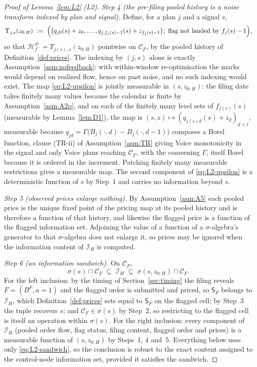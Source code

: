 \documentclass[11pt]{article}
\newcommand{\Sfl}{\mathsf{S}_F}
\begin{document}
\begin{proof}[Proof of Lemma~\ref{lem:L2} (L2)]
\emph{Step 4 (the pre-filing pooled history is a noise transform indexed by plan and signal).}
Define, for a plan $j$ and a signal $s$,
\begin{equation}
\label{eq:L2-upsilon}
\Upsilon_{j,s}(z_{0:H}) \;:=\;
  \Bigl( \bigl(q_{j0}(s)+z_0,\dots,q_{j,f_j(s)-1}(s)+z_{f_j(s)-1}\bigr);\ \text{flag not landed by }
  f_j(s)-1 \Bigr),
\end{equation}
so that $\mathcal H_{f^-}^P = \Upsilon_{j(s),s}(z_{0:H})$ pointwise on $\mathcal C_F$, by the pooled
history of Definition~\ref{def:prices}. The indexing by $(j,s)$ alone is exactly
Assumption~\ref{asm:nofeedback}: with within-window re-optimisation the marks would depend on
realised flow, hence on past noise, and no such indexing would exist. The map
\eqref{eq:L2-upsilon} is jointly measurable in $(s,z_{0:H})$: the filing date takes finitely many
values because the calendar is finite by Assumption~\ref{asm:A2p}, and on each of the finitely many
level sets of $f_{j(s)}(s)$ (measurable by Lemma~\ref{lem:D1}), the map is
$(s,z) \mapsto (q_{j(s)d}(s)+z_d)_{d<t}$, measurable because
$q_{jd} = \Gamma\bigl(B_j(\cdot,d)-B_j(\cdot,d-1)\bigr)$ composes a Borel function, clause (TR-ii) of
Assumption~\ref{asm:TR} giving Voice monotonicity in the signal and only Voice plans reaching
$\mathcal C_F$, with the coarsening $\Gamma$, itself Borel because it is ordered in the increment.
Patching finitely many measurable restrictions gives a measurable map. The second component of
\eqref{eq:L2-upsilon} is a deterministic function of $s$ by Step~1 and carries no information beyond
$s$.

\emph{Step 5 (observed prices enlarge nothing).} By Assumption~\ref{asm:A5} each pooled price is the
unique fixed point of the pricing map at its pooled history and is therefore a function of that
history, and likewise the flagged price is a function of the flagged information set. Adjoining the
value of a function of a $\sigma$-algebra's generator to that $\sigma$-algebra does not enlarge it,
so prices may be ignored when the information content of $\mathcal I_H$ is computed.

\emph{Step 6 (an information sandwich).} On $\mathcal C_F$,
\begin{equation}
\label{eq:L2-sandwich}
\sigma(s) \cap \mathcal C_F \;\subseteq\; \mathcal I_H \;\subseteq\;
  \sigma(s,z_{0:H}) \cap \mathcal C_F .
\end{equation}
For the left inclusion: by the timing of Section~\ref{sec:timing} the filing reveals
$F = (B^F,a{=}1)$ and the flagged order is submitted and priced, so $\Sfl$ belongs to $\mathcal I_H$,
which Definition~\ref{def:prices} sets equal to $\Sfl$ on the flagged cell; by Step~3 the tuple
recovers $s$; and $\mathcal C_F \in \sigma(s)$ by Step~2, so restricting to the flagged cell is
itself an operation within $\sigma(s)$. For the right inclusion: every component of $\mathcal I_H$
(pooled order flow, flag status, filing content, flagged order and prices) is a measurable
function of $(s,z_{0:H})$ by Steps~1, 4 and~5. Everything below uses only
\eqref{eq:L2-sandwich}, so the conclusion is robust to the exact content assigned to the
control-node information set, provided it satisfies the sandwich.


\end{proof}
\end{document}

